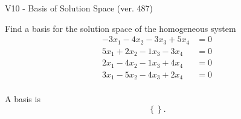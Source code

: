 \begin{exercise}
  \begin{exerciseTitle}V10 - Basis of Solution Space (ver. 487)\end{exerciseTitle}
  \begin{exerciseStatement}
    Find a basis for the solution space of the homogeneous system 
\begin{align*}
 -3 x_ 1 -4 x_ 2 -3 x_ 3 + 5 x_ 4 &= 0  \\ 
  5 x_ 1 + 2 x_ 2 -1 x_ 3 -3 x_ 4 &= 0  \\ 
  2 x_ 1 -4 x_ 2 -1 x_ 3 + 4 x_ 4 &= 0  \\ 
  3 x_ 1 -5 x_ 2 -4 x_ 3 + 2 x_ 4 &= 0  \\ 
 \end{align*}


 
  \end{exerciseStatement}

  \begin{exerciseAnswer}
   A basis is   
\[\left\{\right\}.\]

  


  \end{exerciseAnswer}
\end{exercise}